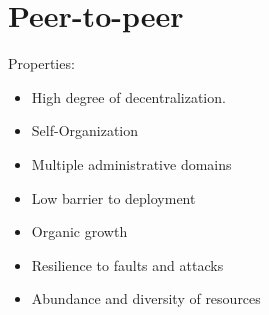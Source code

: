 \section{Peer-to-peer}
\parencite{Rodrigues:2010:PS:1831407.1831427}
Properties:
\begin{itemize}
\item High degree of decentralization. 
\item Self-Organization
\item Multiple administrative domains
\item Low barrier to deployment
\item Organic growth
\item Resilience to faults and attacks
\item Abundance and diversity of resources

\end{itemize}